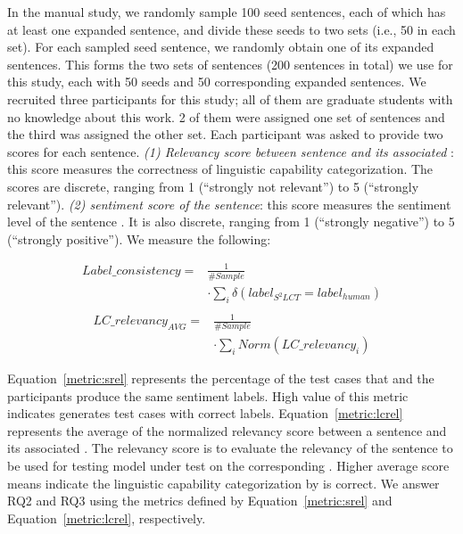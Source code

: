 In the manual study, we randomly sample 100 \tool seed sentences, each
of which has at least one expanded sentence, and divide these seeds to
two sets (i.e., 50 in each set). For each sampled seed sentence, we
randomly obtain one of its expanded sentences.  This forms the two
sets of sentences (200 sentences in total) we use for this study, each
with 50 seeds and 50 corresponding expanded sentences.  We recruited
three participants for this study; all of them are graduate students
with no knowledge about this work.  2 of them were assigned one set of
sentences and the third was assigned the other set.  Each participant
was asked to provide two scores for each sentence.  \emph{(1)
Relevancy score between sentence and its associated \lc}: this score
measures the correctness of \tool linguistic capability
categorization.  The scores are discrete, ranging from 1 (``strongly
not relevant'') to 5 (``strongly relevant''). \emph{(2) sentiment
score of the sentence}: this score measures the sentiment level of the
sentence . It is also discrete, ranging from 1 (``strongly negative'')
to 5 (``strongly positive'').  We measure the following:

\begin{equation}
\begin{aligned}
  Label\_consistency = &\frac{1}{\#Sample}\\
  &\cdot \sum_{i} \delta(label_{S^2LCT}=label_{human})\label{metric:srel}\\
\end{aligned}
\end{equation}
\begin{equation}
\begin{aligned}
  LC\_relevancy_{AVG} = &\frac{1}{\#Sample}\\
  &\cdot\sum_{i} Norm(LC\_relevancy_i) \label{metric:lcrel}
\end{aligned}
\end{equation}

Equation~\ref{metric:srel} represents the percentage of the test cases
that \tool and the participants produce the same sentiment
labels. High value of this metric indicates \tool generates test cases
with correct labels. Equation~\ref{metric:lcrel} represents the
average of the normalized relevancy score between a sentence and its
associated \lc. The relevancy score is to evaluate the relevancy of
the sentence to be used for testing model under test on the
corresponding \lc. Higher average score means indicate the linguistic
capability categorization by \tool is correct. We answer RQ2 and RQ3
using the metrics defined by Equation~\ref{metric:srel} and
Equation~\ref{metric:lcrel}, respectively.





